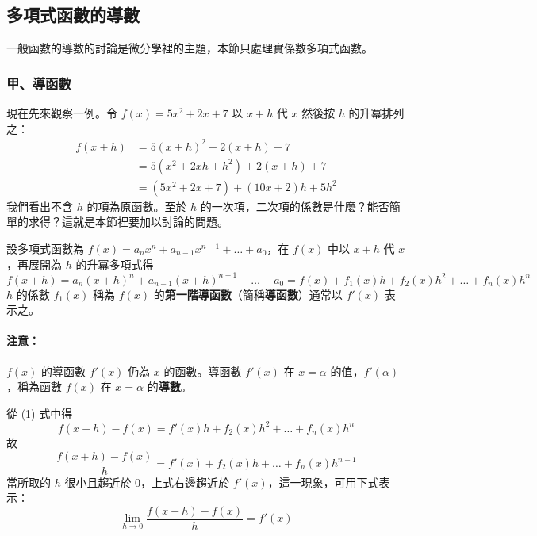 \subsection{多項式函數的導數}\label{sec:b6s-2-4}
\resetsectcounters

一般函數的導數的討論是微分學裡的主題，本節只處理實係數多項式函數。

\subsubsection*{甲、導函數}\label{subsec:b6s-2-4-a}

現在先來觀察一例。令 $f(x)=5x^2+2x+7$ 以 $x+h$ 代 $x$ 然後按 $h$ 的升冪排列之：
\begin{align*}
f(x+h) &= 5(x+h)^2 + 2(x+h) + 7 \\
&= 5(x^2+2xh+h^2) + 2(x+h) + 7 \\
&= (5x^2+2x+7) + (10x+2)h + 5h^2
\end{align*}
我們看出不含 $h$ 的項為原函數。至於 $h$ 的一次項，二次項的係數是什麼？能否簡單的求得？這就是本節裡要加以討論的問題。

\begin{definition}\label{def:b6s-2-derivative}
設多項式函數為 $f(x)=a_n x^n + a_{n-1} x^{n-1} + \dots + a_0$，在 $f(x)$ 中以 $x+h$ 代 $x$，再展開為 $h$ 的升冪多項式得
\begin{equation}
f(x+h) = a_n(x+h)^n + a_{n-1}(x+h)^{n-1} + \dots + a_0 = f(x) + f_1(x)h + f_2(x)h^2 + \dots + f_n(x)h^n \label{eq:b6s-2-4-1}
\end{equation}
$h$ 的係數 $f_1(x)$ 稱為 $f(x)$ 的\textbf{第一階導函數}（簡稱\textbf{導函數}）通常以 $f'(x)$ 表示之。
\end{definition}

\paragraph{注意：}$f(x)$ 的導函數 $f'(x)$ 仍為 $x$ 的函數。導函數 $f'(x)$ 在 $x=\alpha$ 的值，$f'(\alpha)$，稱為函數 $f(x)$ 在 $x=\alpha$ 的\textbf{導數}。

\begin{discussion}\label{disc:b6s-2-4}
從 (1) 式中得
\[ f(x+h) - f(x) = f'(x)h + f_2(x)h^2 + \dots + f_n(x)h^n \]
故
\[ \dfrac{f(x+h)-f(x)}{h} = f'(x) + f_2(x)h + \dots + f_n(x)h^{n-1} \]
當所取的 $h$ 很小且趨近於 0，上式右邊趨近於 $f'(x)$，這一現象，可用下式表示：
\[ \lim_{h \to 0} \dfrac{f(x+h)-f(x)}{h} = f'(x) \]
\end{discussion}

